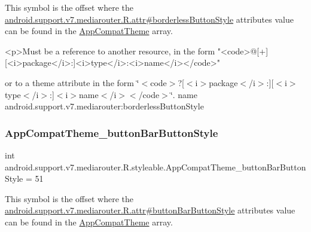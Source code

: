 This symbol is the offset where the \hyperlink{classandroid_1_1support_1_1v7_1_1mediarouter_1_1R_1_1attr_ad2cab4a93ee5938fca8062352d185a11}{android.\+support.\+v7.\+mediarouter.\+R.\+attr\#borderless\+Button\+Style} attribute\textquotesingle{}s value can be found in the \hyperlink{classandroid_1_1support_1_1v7_1_1mediarouter_1_1R_1_1styleable_a4e3d3900c75d49aeb2f283cac00214d6}{App\+Compat\+Theme} array.

\begin{DoxyVerb}      <p>Must be a reference to another resource, in the form "<code>@[+][<i>package</i>:]<i>type</i>:<i>name</i></code>"
\end{DoxyVerb}
 or to a theme attribute in the form \char`\"{}$<$code$>$?\mbox{[}$<$i$>$package$<$/i$>$\+:\mbox{]}\mbox{[}$<$i$>$type$<$/i$>$\+:\mbox{]}$<$i$>$name$<$/i$>$$<$/code$>$\char`\"{}.  name android.\+support.\+v7.\+mediarouter\+:borderless\+Button\+Style \mbox{\label{classandroid_1_1support_1_1v7_1_1mediarouter_1_1R_1_1styleable_ad20f3db7aa5369c7dcfc5bd51371b85a}} 
\subsubsection{\texorpdfstring{App\+Compat\+Theme\+\_\+button\+Bar\+Button\+Style}{AppCompatTheme\_buttonBarButtonStyle}}
{\footnotesize\ttfamily int android.\+support.\+v7.\+mediarouter.\+R.\+styleable.\+App\+Compat\+Theme\+\_\+button\+Bar\+Button\+Style = 51\hspace{0.3cm}{\ttfamily [static]}}

This symbol is the offset where the \hyperlink{classandroid_1_1support_1_1v7_1_1mediarouter_1_1R_1_1attr_afdd7ffe7fa20cbfce04ccfca073c37d1}{android.\+support.\+v7.\+mediarouter.\+R.\+attr\#button\+Bar\+Button\+Style} attribute\textquotesingle{}s value can be found in the \hyperlink{classandroid_1_1support_1_1v7_1_1mediarouter_1_1R_1_1styleable_a4e3d3900c75d49aeb2f283cac00214d6}{App\+Compat\+Theme} array.

